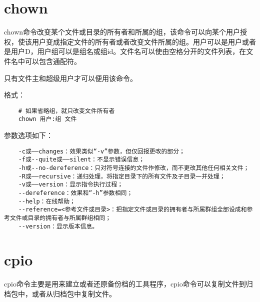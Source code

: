\documentclass[a4paper,left=2.5cm,right=2.5cm,11pt]{article}
\begin{document}
\section{chown}
	chown命令改变某个文件或目录的所有者和所属的组，该命令可以向某个用户授权，使该用户变成指定文件的所有者或者改变文件所属的组。用户可以是用户或者是用户D，用户组可以是组名或组id。文件名可以使由空格分开的文件列表，在文件名中可以包含通配符。\par
	只有文件主和超级用户才可以便用该命令。\par

	格式：
	\begin{lstlisting}
	# 如果省略组，就只改变文件所有者
	chown 用户:组 文件
	\end{lstlisting}

	参数选项如下：
	\begin{lstlisting}
	-c或——changes：效果类似“-v”参数，但仅回报更改的部分； 
	-f或--quite或——silent：不显示错误信息； 
	-h或--no-dereference：只对符号连接的文件作修改，而不更改其他任何相关文件； 
	-R或——recursive：递归处理，将指定目录下的所有文件及子目录一并处理； 
	-v或——version：显示指令执行过程； 
	--dereference：效果和“-h”参数相同； 
	--help：在线帮助； 
	--reference=<参考文件或目录>：把指定文件或目录的拥有者与所属群组全部设成和参考文件或目录的拥有者与所属群组相同； 
	--version：显示版本信息。
	\end{lstlisting}

\section{cpio}
	cpio命令主要是用来建立或者还原备份档的工具程序，cpio命令可以复制文件到归档包中，或者从归档包中复制文件。\par
\end{document}
